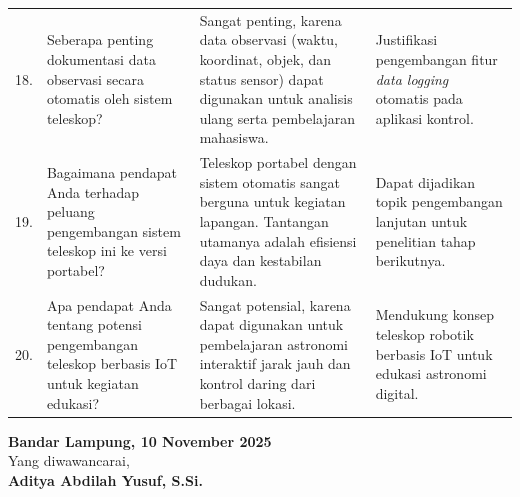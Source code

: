 \begin{longtable}{| b{} | p{} | p{} | p{} |}
	18. & Seberapa penting dokumentasi data observasi secara otomatis oleh sistem teleskop? &
	Sangat penting, karena data observasi (waktu, koordinat, objek, dan status sensor) dapat digunakan untuk analisis ulang serta pembelajaran mahasiswa. &
	Justifikasi pengembangan fitur \textit{data logging} otomatis pada aplikasi kontrol. \\
	
	19. & Bagaimana pendapat Anda terhadap peluang pengembangan sistem teleskop ini ke versi portabel? &
	Teleskop portabel dengan sistem otomatis sangat berguna untuk kegiatan lapangan. Tantangan utamanya adalah efisiensi daya dan kestabilan dudukan. &
	Dapat dijadikan topik pengembangan lanjutan untuk penelitian tahap berikutnya. \\
	\hline
	
	20. & Apa pendapat Anda tentang potensi pengembangan teleskop berbasis IoT untuk kegiatan edukasi? &
	Sangat potensial, karena dapat digunakan untuk pembelajaran astronomi interaktif jarak jauh dan kontrol daring dari berbagai lokasi. &
	Mendukung konsep teleskop robotik berbasis IoT untuk edukasi astronomi digital. \\
	\hline
	
\end{longtable}
\vspace{2cm} %
\begin{flushright}
	\textbf{Bandar Lampung, 10 November 2025} \\[1cm]
	Yang diwawancarai, \\[2cm] %
	\textbf{Aditya Abdilah Yusuf, S.Si.} \\ %
\end{flushright}

